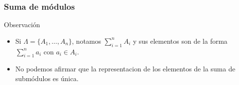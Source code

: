 \documentclass[notes=show]{beamer}%
\newenvironment{Ob}{\begin{block}{Observación}}{\end{block}}
\begin{document}
\begin{frame}%


\bigskip%
\frametitle{Suma de módulos}%


\begin{Ob}
\bigskip

\begin{itemize}
\item Si $\Lambda=\{A_{1},\ldots,A_{n}\}$, notamos $%
{\displaystyle\sum\limits_{i=1}^{n}}
A_{i}$ y sus elementos son de la forma $%
{\displaystyle\sum\limits_{i=1}^{n}}
a_{i}$ con $a_{i}\in A_{i}$.

\item No podemos afirmar que la representacion de los elementos de la suma de
submódulos es única.
\end{itemize}
\end{Ob}

%

\transboxout
\end{frame}%


\bigskip%
\end{document}
